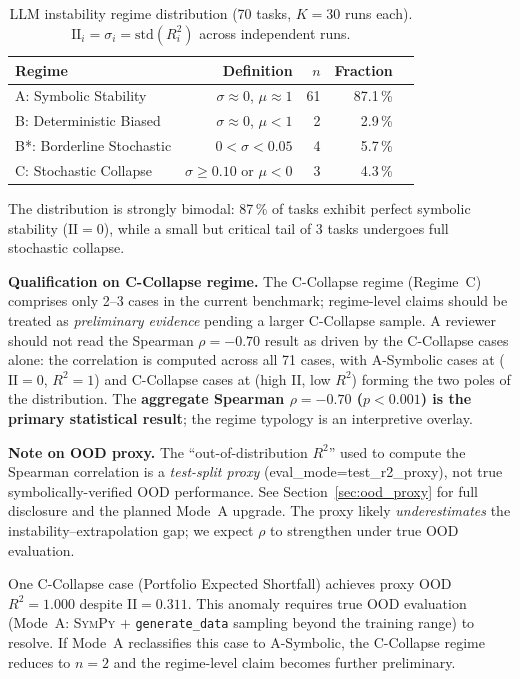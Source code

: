 \documentclass[twoside,11pt]{article}
\newcommand{\Rsq}{R^{2}}
\newcommand{\II}{\mathrm{II}}
\begin{document}
\begin{table}[h]
\centering
\caption{LLM instability regime distribution (70 tasks, $K=30$ runs each).
$\II_i = \sigma_i = \mathrm{std}(R^2_i)$ across independent runs.}
\label{tab:instability}
\begin{tabular}{lrrrr}
\toprule
Regime & Definition & $n$ & Fraction \\
\midrule
A: Symbolic Stability   & $\sigma\approx0$, $\mu\approx1$            & 61 & 87.1\,\% \\
B: Deterministic Biased & $\sigma\approx0$, $\mu<1$                  &  2 & 2.9\,\%  \\
B*: Borderline Stochastic & $0 < \sigma < 0.05$                      &  4 & 5.7\,\%  \\
C: Stochastic Collapse  & $\sigma \ge 0.10$ or $\mu < 0$             &  3 & 4.3\,\%  \\
\bottomrule
\end{tabular}
\end{table}

The distribution is strongly bimodal: 87\,\% of tasks exhibit perfect symbolic
stability ($\II=0$), while a small but critical tail of 3 tasks undergoes full
stochastic collapse.

\textbf{Qualification on C-Collapse regime.}  The C-Collapse regime
(Regime~C) comprises only 2--3 cases in the current benchmark; regime-level
claims should be treated as \emph{preliminary evidence} pending a larger
C-Collapse sample.  A reviewer should not read the Spearman $\rho=-0.70$ result
as driven by the C-Collapse cases alone: the correlation is computed across all
71 cases, with A-Symbolic cases at ($\II=0$, $\Rsq=1$) and C-Collapse cases at
(high $\II$, low $\Rsq$) forming the two poles of the distribution.  The
\textbf{aggregate Spearman $\rho=-0.70$ ($p<0.001$) is the primary statistical
result}; the regime typology is an interpretive overlay.

\textbf{Note on OOD proxy.}  The ``out-of-distribution $\Rsq$'' used to compute
the Spearman correlation is a \emph{test-split proxy} (eval\_mode=test\_r2\_proxy),
not true symbolically-verified OOD performance.  See Section~\ref{sec:ood_proxy}
for full disclosure and the planned Mode~A upgrade.  The proxy likely
\emph{underestimates} the instability--extrapolation gap; we expect $\rho$ to
strengthen under true OOD evaluation.

One C-Collapse case (Portfolio Expected Shortfall) achieves proxy OOD $\Rsq=1.000$
despite $\II=0.311$.  This anomaly requires true OOD evaluation (Mode~A:
\textsc{SymPy} + \texttt{generate\_data} sampling beyond the training range) to
resolve.  If Mode~A reclassifies this case to A-Symbolic, the C-Collapse regime
reduces to $n=2$ and the regime-level claim becomes further preliminary.
\end{document}
